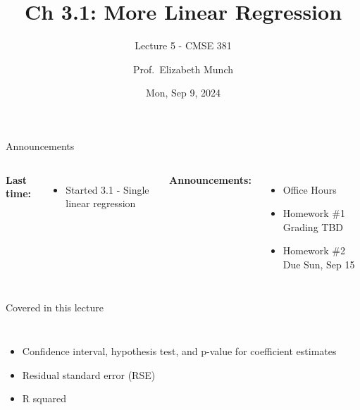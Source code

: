 \documentclass[aspectratio=169,usenames,dvipsnames]{beamer}
\begin{document}
\title[]{Ch 3.1: More Linear Regression}
\subtitle{Lecture 5 - CMSE 381}
\date{Mon, Sep 9, 2024}



\author[Dr.~Munch]{Prof.~Elizabeth Munch}

\begin{frame}
 \titlepage


\end{frame}
\begin{frame}[c]{Announcements}

\begin{columns}
\centering

	\textbf{Last time:}
	\begin{itemize}
		\item Started 3.1 - Single linear regression
	\end{itemize}
\centering

	\textbf{Announcements:}
	\begin{itemize}
		\item Office Hours
		\item Homework \#1 Grading TBD 
		\item Homework \#2 Due Sun, Sep 15
	\end{itemize}
\end{columns}

\end{frame}
\begin{frame}[c]{Covered in this lecture }

\begin{columns}
\centering
\begin{itemize}
	\item Confidence interval, hypothesis test, and p-value for coefficient estimates
	\item Residual standard error (RSE)
	\item R squared
\end{itemize}
\centering

\end{columns}

\end{frame}
\end{document}
